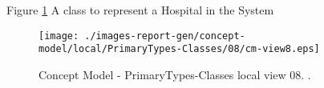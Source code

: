 Figure \ref{fig:lu.uni.lassy.excalibur.examples.icrash-CM-view-local-PrimaryTypes-Classes-08} A class to represent a Hospital in the System



\begin{figure}[htbp] 
\label{fig:lu.uni.lassy.excalibur.examples.icrash-CM}
\begin{center}
\texttt{[image: ./images-report-gen/concept-model/local/PrimaryTypes-Classes/08/cm-view8.eps]}
\end{center}
\caption[Concept Model - PrimaryTypes-Classes local view 08 - ]{Concept Model - PrimaryTypes-Classes local view 08. .}
\label{fig:lu.uni.lassy.excalibur.examples.icrash-CM-view-local-PrimaryTypes-Classes-08}
\end{figure}
\vspace{0.5cm} 

